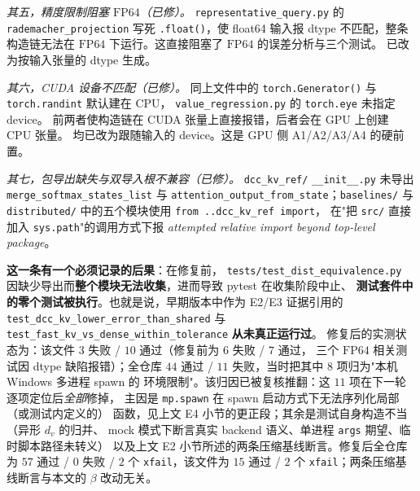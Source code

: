 \emph{其五，精度限制阻塞 $\mathrm{FP64}$（已修）。}
\texttt{representative\_}\allowbreak\texttt{query.py} 的 \texttt{rademacher\_projection} 写死
\texttt{.float()}，使 float64 输入报 dtype 不匹配，整条构造链无法在
$\mathrm{FP64}$ 下运行。这直接阻塞了 $\mathrm{FP64}$ 的误差分析与三个测试。
已改为按输入张量的 dtype 生成。

{\sloppy
\emph{其六，CUDA 设备不匹配（已修）。}
同上文件中的 \texttt{torch.}\allowbreak\texttt{Generator()} 与
\texttt{torch.}\allowbreak\texttt{randint} 默认建在 CPU，
\texttt{value\_}\allowbreak\texttt{regression.py} 的 \texttt{torch.}\allowbreak\texttt{eye} 未指定 device。
前两者使构造链在 CUDA 张量上直接报错，后者会在 GPU 上创建 CPU 张量。
均已改为跟随输入的 device。这是 GPU 侧 A1/A2/A3/A4 的硬前置。
\par}

\emph{其七，包导出缺失与双导入根不兼容（已修）。}
\texttt{dcc\_}\allowbreak\texttt{kv\_}\allowbreak\texttt{ref/}\allowbreak
\texttt{\_\_init\_\_.py} 未导出
\texttt{merge\_}\allowbreak\texttt{softmax\_}\allowbreak\texttt{states\_}\allowbreak\texttt{list}
与 \texttt{attention\_output\_from\_state}；\texttt{baselines/} 与
\texttt{distributed/} 中的五个模块使用 \texttt{from ..dcc\_kv\_ref import}，
在"把 \texttt{src/} 直接加入 \texttt{sys.path}"的调用方式下报
\emph{attempted relative import beyond top-level package}。

\textbf{这一条有一个必须记录的后果}：在修复前，
\texttt{tests/}\allowbreak\texttt{test\_}\allowbreak\texttt{dist\_}\allowbreak\texttt{equivalence.py}
因缺少导出而\textbf{整个模块无法收集}，进而导致 pytest 在收集阶段中止、
\textbf{测试套件中的零个测试被执行}。也就是说，早期版本中作为 E2/E3 证据引用的
\texttt{test\_}\allowbreak\texttt{dcc\_}\allowbreak\texttt{kv\_}\allowbreak\texttt{lower\_}\allowbreak\texttt{error\_}\allowbreak\texttt{than\_}\allowbreak\texttt{shared} 与
\texttt{test\_}\allowbreak\texttt{fast\_}\allowbreak\texttt{kv\_}\allowbreak\texttt{vs\_}\allowbreak\texttt{dense\_}\allowbreak\texttt{within\_}\allowbreak\texttt{tolerance} \textbf{从未真正运行过}。
修复后的实测状态为：该文件 $3$ 失败 / $10$ 通过（修复前为 $6$ 失败 / $7$ 通过，
三个 $\mathrm{FP64}$ 相关测试因 dtype 缺陷报错）；全仓库
$44$ 通过 / $11$ 失败，当时把其中 $8$ 项归为"本机 Windows 多进程 spawn 的
环境限制"。该归因已被复核推翻：这 $11$ 项在下一轮逐项定位后\emph{全部}修掉，
主因是 \texttt{mp.spawn} 在 spawn 启动方式下无法序列化局部（或测试内定义的）
函数，见上文 E4 小节的更正段；其余是测试自身构造不当（异形 $d_v$ 的归并、
mock 模式下断言真实 backend 语义、单进程 \texttt{args} 期望、临时脚本路径未转义）
以及上文 E2 小节所述的两条压缩基线断言。修复后全仓库为
$57$ 通过 / $0$ 失败 / $2$ 个 \texttt{xfail}，该文件为 $15$ 通过 /
$2$ 个 \texttt{xfail}；两条压缩基线断言与本文的 $\beta$ 改动无关。

